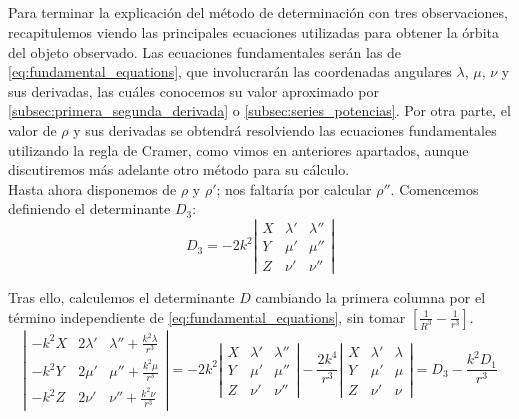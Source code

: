 \documentclass[11pt]{article}
\begin{document}
\subsection{}
\label{subsec:fundamental_equations}
Para terminar la explicación del método de determinación con tres observaciones, recapitulemos viendo las principales ecuaciones utilizadas para obtener la órbita del objeto observado. Las ecuaciones fundamentales serán las de \eqref{eq:fundamental_equations}, que involucrarán las coordenadas angulares $\lambda$, $\mu$, $\nu$ y sus derivadas, las cuáles conocemos su valor aproximado por \ref{subsec:primera_segunda_derivada} o \ref{subsec:series_potencias}. Por otra parte, el valor de $\rho$ y sus derivadas se obtendrá resolviendo las ecuaciones fundamentales utilizando la regla de Cramer, como vimos en anteriores apartados, aunque discutiremos más adelante otro método para su cálculo.\\

Hasta ahora disponemos de $\rho$ y $\rho'$; nos faltaría por calcular $\rho''$. Comencemos definiendo el determinante $D_3$:
\[
D_3=-2k^2
\left|
\begin{array}{ccc}
X & \lambda' & \lambda''\\
Y & \mu' & \mu''\\
Z & \nu' & \nu''
\end{array}
\right|
\]

Tras ello, calculemos el determinante $D$ cambiando la primera columna por el término independiente de \eqref{eq:fundamental_equations}, sin tomar $[\frac{1}{R^3}-\frac{1}{r^3}]$. 
\[
\left|
\begin{array}{ccc}
-k^2X & 2\lambda' & \lambda''+\frac{k^2\lambda}{r^3}\\
-k^2Y & 2\mu' & \mu''+\frac{k^2\mu}{r^3}\\
-k^2Z & 2\nu' & \nu''+\frac{k^2\nu}{r^3}
\end{array}
\right|
=-2k^2
\left|
\begin{array}{ccc}
X & \lambda' & \lambda''\\
Y & \mu' & \mu''\\
Z & \nu' & \nu''
\end{array}
\right|
-\frac{2k^4}{r^3}
\left|
\begin{array}{ccc}
X & \lambda' & \lambda\\
Y & \mu' & \mu\\
Z & \nu' & \nu
\end{array}
\right|
=
D_3-\frac{k^2D_1}{r^3}
\]
\end{document}
